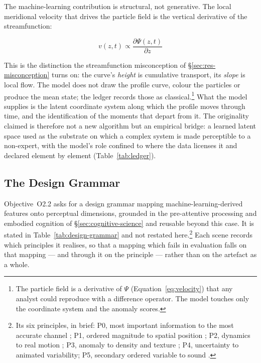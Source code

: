 The machine-learning contribution is structural, not generative. The local meridional velocity that drives the particle field is the vertical derivative of the streamfunction:

\begin{equation}
\label{eq:velocity}
v(z, t) \propto \frac{\partial \Psi(z, t)}{\partial z}
\end{equation}

\noindent This is the distinction the streamfunction misconception of \S\ref{sec:res-misconception} turns on: the curve's \emph{height} is cumulative transport, its \emph{slope} is local flow. The model does not draw the profile curve, colour the particles or produce the mean state; the ledger records those as classical.\footnote{The particle field is a derivative of $\Psi$ (Equation~\ref{eq:velocity}) that any analyst could reproduce with a difference operator. The model touches only the coordinate system and the anomaly scores.} What the model supplies is the latent coordinate system along which the profile moves through time, and the identification of the moments that depart from it. The originality claimed is therefore not a new algorithm but an empirical bridge: a learned latent space used as the substrate on which a complex system is made perceptible to a non-expert, with the model's role confined to where the data licenses it and declared element by element (Table~\ref{tab:ledger}).

\subsection{The Design Grammar}
\label{subsec:grammar}

Objective~O2.2 asks for a design grammar mapping machine-learning-derived features onto perceptual dimensions, grounded in the pre-attentive processing and embodied cognition of \S\ref{sec:cognitive-science} and reusable beyond this case. It is stated in Table~\ref{tab:design-grammar} and not restated here.\footnote{Its six principles, in brief: P0, most important information to the most accurate channel \parencite{munzner2014,bertin1983}; P1, ordered magnitude to spatial position \parencite{clevelandmcgill1984}; P2, dynamics to real motion \parencite{sterman2008,cronin2009}; P3, anomaly to density and texture \parencite{bertin1983,ware2021}; P4, uncertainty to animated variability; P5, secondary ordered variable to sound \parencite{hermann2011}.} Each scene records which principles it realises, so that a mapping which fails in evaluation falls on that mapping --- and through it on the principle --- rather than on the artefact as a whole.

